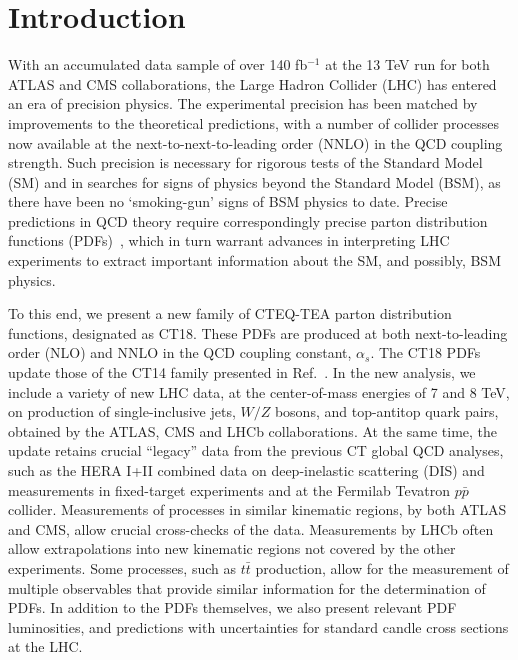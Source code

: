 \section{\label{sec:Introduction} Introduction}

With an accumulated data sample of over 140 fb$^{-1}$ at the 13 TeV run for both ATLAS and CMS collaborations, the Large Hadron Collider (LHC) has entered an era of precision physics.
The experimental precision has been matched by improvements to the theoretical predictions, with a number of collider processes now available at the next-to-next-to-leading order
(NNLO) in the QCD coupling strength. Such precision is necessary for rigorous tests of the Standard Model (SM) and in searches for signs of physics beyond the Standard Model
(BSM), as there have been no `smoking-gun' signs of BSM physics to date. Precise predictions in QCD theory require correspondingly precise parton distribution
functions (PDFs)~\cite{Dulat:2015mca,Harland-Lang:2014zoa,Ball:2017nwa,Alekhin:2017kpj,Accardi:2016qay,Harland-Lang:2019pla,Bertone:2017bme,Manohar:2017eqh},
which in turn warrant advances in interpreting LHC experiments to extract important information about the SM, and possibly, BSM physics.

To this end, we present a new family of CTEQ-TEA parton distribution functions, designated as CT18. These PDFs are produced at both next-to-leading order (NLO) and NNLO in the QCD coupling constant, $\alpha_s$. The CT18 PDFs update those of the CT14 family presented in Ref.~\cite{Dulat:2015mca}.
In the new analysis, we include a variety of new LHC data, at the center-of-mass energies of 7 and 8 TeV, on production of single-inclusive jets, $W/Z$ bosons, and top-antitop
quark pairs, obtained by the ATLAS, CMS and LHCb collaborations. At the same time, the update retains crucial ``legacy'' data from the previous CT global QCD analyses, such as the HERA I+II combined data on deep-inelastic scattering (DIS) and measurements in fixed-target experiments and at the Fermilab Tevatron $p\bar p$ collider. Measurements of processes in similar kinematic regions, by both ATLAS and CMS, allow crucial cross-checks of the data. Measurements by LHCb often allow extrapolations into new kinematic regions not covered by the other experiments. Some processes, such as $t\bar{t}$ production, allow for the measurement of multiple observables that provide similar information for the determination of PDFs. 
In addition to the PDFs themselves, we also present relevant PDF luminosities, and predictions with uncertainties for standard candle cross sections at the LHC.

